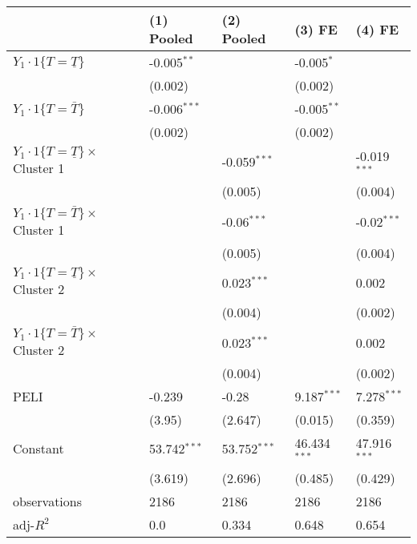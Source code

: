 \documentclass[12px]{article}
\begin{document}
 
\begin{tabular}{lllll}
\hline
 & (1) Pooled & (2) Pooled & (3) FE & (4) FE \\
\hline
$Y_1\cdot\text{1}\{T=\underline{T}\}$ & -0.005$^{**}$ &  & -0.005$^{*}$ &  \\
 & (0.002) &  & (0.002) &  \\
$Y_1\cdot\text{1}\{T=\bar{T}\}$ & -0.006$^{***}$ &  & -0.005$^{**}$ &  \\
 & (0.002) &  & (0.002) &  \\
$Y_1\cdot\text{1}\{T=\underline{T}\}\times$ Cluster 1 &  & -0.059$^{***}$ &  & -0.019$^{***}$ \\
 &  & (0.005) &  & (0.004) \\
$Y_1\cdot\text{1}\{T=\bar{T}\}\times$ Cluster 1 &  & -0.06$^{***}$ &  & -0.02$^{***}$ \\
 &  & (0.005) &  & (0.004) \\
$Y_1\cdot\text{1}\{T=\underline{T}\}\times$ Cluster 2 &  & 0.023$^{***}$ &  & 0.002 \\
 &  & (0.004) &  & (0.002) \\
$Y_1\cdot\text{1}\{T=\bar{T}\}\times$ Cluster 2 &  & 0.023$^{***}$ &  & 0.002 \\
 &  & (0.004) &  & (0.002) \\
PELI & -0.239 & -0.28 & 9.187$^{***}$ & 7.278$^{***}$ \\
 & (3.95) & (2.647) & (0.015) & (0.359) \\
Constant & 53.742$^{***}$ & 53.752$^{***}$ & 46.434$^{***}$ & 47.916$^{***}$ \\
 & (3.619) & (2.696) & (0.485) & (0.429) \\\hline

observations & 2186 & 2186 & 2186 & 2186 \\
adj-$R^2$ & 0.0 & 0.334 & 0.648 & 0.654 \\
\hline
\end{tabular}

 
\end{document}
